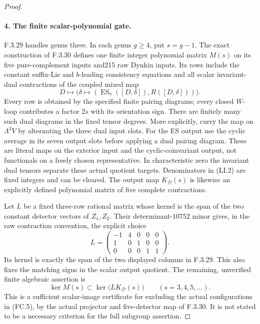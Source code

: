 \begin{proof}
\paragraph{4. The finite scalar-polynomial gate.}
F.3.29 handles genus three. In each genus
$g\geq4$, put $s=g-1$. The exact construction
of F.3.30 defines one finite integer
polynomial matrix $M(s)$ on its five
pure-complement inputs and215 raw Dynkin
inputs. Its rows include the constant
suffix-Lie and $b$-leading consistency
equations and all scalar invariant-dual
contractions of the coupled mixed map
\[
 D\longmapsto\bigl(\delta\mapsto
    (\operatorname{ES}_7([D,\delta]),R([D,\delta]))\bigr).
\]
Every row is obtained by the specified
finite pairing diagrams; every closed
$W$-loop contributes a factor $2s$ with
its orientation sign. There are finitely
many such dual diagrams in the fixed
tensor degrees. More explicitly, curry the
map on $\Lambda^3V$ by alternating the three
dual input slots. For the ES output use
the cyclic average in its seven output
slots before applying a dual pairing
diagram. These are literal maps on the
exterior input and the cyclic-coinvariant
output, not functionals on a freely
chosen representative. In characteristic
zero the invariant dual tensors separate
these actual quotient targets. Denominators in (LI.2)
are fixed integers and can be cleared.
The output map $K_{\mathcal D}(s)$ is
likewise an explicitly defined polynomial
matrix of five complete contractions.

Let $L$ be a fixed three-row rational matrix
whose kernel is the span of the two
constant detector vectors of $Z_1,Z_2$.
Their determinant-$10752$ minor gives, in the raw
contraction convention, the explicit choice
\[
 L=\begin{pmatrix}-1&4&0&0&0\\1&0&1&0&0\\0&0&0&1&1\end{pmatrix}.
\]
Its kernel is exactly the span of the two displayed
columns in F.3.29. This also fixes the matching signs
in the scalar output quotient.
The remaining, unverified finite algebraic
assertion is
\[
 \ker M(s)\subset\ker\bigl(LK_{\mathcal D}(s)\bigr)
                    \qquad(s=3,4,5,\ldots).                \tag{FC.6}
\]
This is a sufficient scalar-image
certificate for excluding the actual
configurations in (FC.5), by the actual
projector and five-detector map of F.3.30.
It is not stated to be a necessary
criterion for the full subgroup assertion.


\end{proof}
